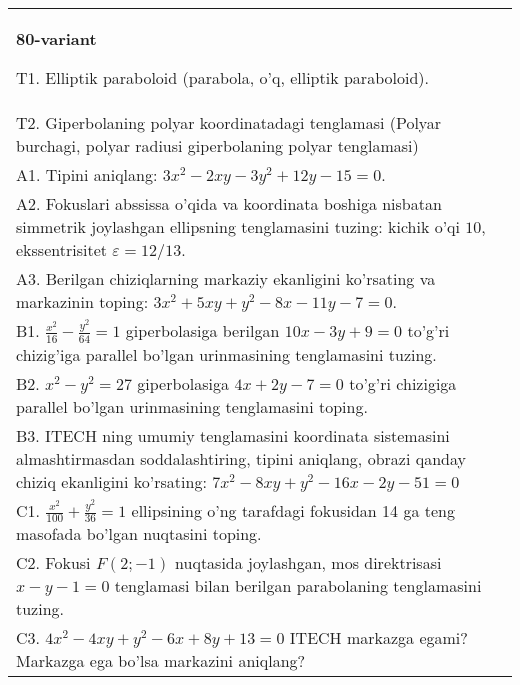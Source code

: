 \documentclass{article}
\begin{document}
\begin{tabular}{m{17cm}}
\textbf{80-variant}
\newline

T1. Elliptik paraboloid (parabola, o'q, elliptik paraboloid).\\

T2. Giperbolaning polyar koordinatadagi tenglamasi (Polyar burchagi, polyar radiusi giperbolaning polyar tenglamasi)\\

A1. Tipini aniqlang: $3x^{2}-2xy-3y^{2}+12y-15=0$.\\

A2. Fokuslari abssissa o'qida va koordinata boshiga nisbatan simmetrik joylashgan ellipsning tenglamasini tuzing: kichik o'qi $10$, ekssentrisitet $\varepsilon=12/13$.\\

A3. Berilgan chiziqlarning markaziy ekanligini ko'rsating va markazinin toping: $3x^{2}+5xy+y^{2}-8x-11y-7=0$.\\

B1. $\frac{x^{2}}{16} - \frac{y^{2}}{64} = 1$ giperbolasiga berilgan $10x - 3y + 9 = 0$ to'g'ri chizig'iga parallel bo'lgan urinmasining tenglamasini tuzing.  \\

B2. $x^{2} - y^{2} = 27$ giperbolasiga $4x + 2y - 7 = 0$ to'g'ri chizigiga parallel bo'lgan urinmasining tenglamasini toping.  \\

B3. ITECH ning umumiy tenglamasini koordinata sistemasini almashtirmasdan soddalashtiring, tipini aniqlang, obrazi qanday chiziq ekanligini ko'rsating: $7x^{2} - 8xy + y^{2} - 16x - 2y - 51 = 0$\\

C1. $\frac{x^{2}}{100} + \frac{y^{2}}{36} = 1$ ellipsining o'ng tarafdagi fokusidan 14 ga teng masofada bo'lgan nuqtasini toping.  \\

C2. Fokusi $F(2; - 1)$ nuqtasida joylashgan, mos direktrisasi $x - y - 1 = 0$ tenglamasi bilan berilgan parabolaning tenglamasini tuzing.  \\

C3. $4x^{2} - 4xy + y^{2} - 6x + 8y + 13 = 0$ ITECH markazga egami? Markazga ega bo'lsa markazini aniqlang?  \\

\end{tabular}
\vspace{1cm}
\end{document}
